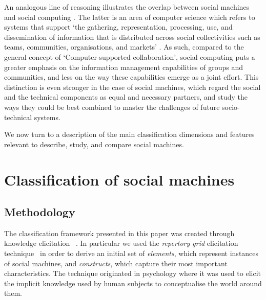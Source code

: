 \documentclass{www13-companion-accepted}
\begin{document}
An analogous line of reasoning illustrates the overlap between social machines and social computing \cite{parameswaran2007research}. The latter is an area of computer science which refers to systems that support `the gathering, representation, processing, use, and dissemination of information that is distributed across social collectivities such as teams, communities, organisations, and markets' \cite{parameswaran2007research}. As such, compared to the general concept of `Computer-supported collaboration', social computing puts a greater emphasis on the information management capabilities of groups and communities, and less on the way these capabilities emerge as a joint effort. This distinction is even stronger in the case of social machines, which regard the social and the technical components as equal and necessary partners, and study the ways they could be best combined to master the challenges of future socio-technical systems.

We now turn to a description of the main classification dimensions and features relevant to describe, study, and compare social machines.

\section{Classification of social machines}
\label{sec:framework}

\subsection{Methodology}
\label{sec:methodology}
The classification framework presented in this paper was created through knowledge elicitation ~\cite{knowledgeelicitation}. In particular we used the {\it repertory grid} elicitation
technique~\cite{kelly} in order to derive an initial set of {\it elements}, which represent instances of social machines, and {\it constructs}, which capture their most important characteristics. The technique originated in psychology where it was used to elicit the implicit knowledge used by human subjects to conceptualise the world around them. 
\end{document}

